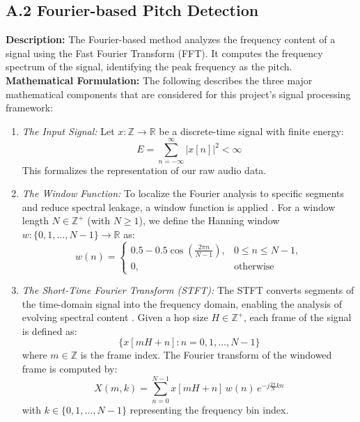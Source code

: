 \documentclass[12pt, titlepage]{article}
\begin{document}
\subsection*{A.2 Fourier-based Pitch Detection}
\textbf{Description:} The Fourier-based method analyzes the frequency content of a signal using the Fast Fourier Transform (FFT).
It computes the frequency spectrum of the signal, identifying the peak frequency as the pitch.\\
\newline
\textbf{Mathematical Formulation:} The following describes the three major mathematical components that are considered for this project's signal processing framework:
\begin{enumerate}
  \item \textit{The Input Signal:}  
  Let \( x: \mathbb{Z} \to \mathbb{R} \) be a discrete-time signal with finite energy:
  \[E = \sum_{n=-\infty}^{\infty} |x[n]|^2 < \infty\]
  This formalizes the representation of our raw audio data.

  \item \textit{The Window Function:}  
  To localize the Fourier analysis to specific segments and reduce spectral leakage, a window function is applied \cite{windows-harmonic-analysis}. For a window length \( N \in \mathbb{Z}^+ \) (with \( N \geq 1 \)), we define the Hanning window \( w: \{0, 1, \dots, N-1\} \to \mathbb{R} \) as:
  \[
  w(n) = 
  \begin{cases}
  0.5 - 0.5\cos\left(\frac{2\pi n}{N-1}\right), & 0 \leq n \leq N-1, \\
  0, & \text{otherwise}
  \end{cases}
  \]

  \item \textit{The Short-Time Fourier Transform (STFT):}  
  The STFT converts segments of the time-domain signal into the frequency domain, enabling the analysis of evolving spectral content \cite{onset-detection, ZhouRiess}. Given a hop size \( H \in \mathbb{Z}^+ \), each frame of the signal is defined as:
  \[\{ x[mH+n] : n = 0, 1, \dots, N-1 \}\]
  where \( m \in \mathbb{Z} \) is the frame index. The Fourier transform of the windowed frame is computed by:
  \[X(m,k) = \sum_{n=0}^{N-1} x[mH+n]\,w(n)\, e^{-j\frac{2\pi}{N}kn}\]
  with \( k \in \{0, 1, \dots, N-1\} \) representing the frequency bin index.
\end{enumerate}
\newpage
\end{document}
